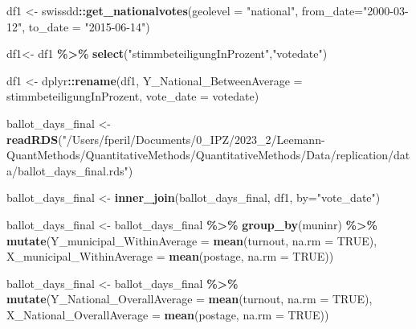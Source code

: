 \documentclass[
]{book}
\newenvironment{Shaded}{\begin{snugshade}}{\end{snugshade}}
\newcommand{\AttributeTok}[1]{\textcolor[rgb]{0.13,0.29,0.53}{#1}}
\newcommand{\ConstantTok}[1]{\textcolor[rgb]{0.56,0.35,0.01}{#1}}
\newcommand{\FunctionTok}[1]{\textcolor[rgb]{0.13,0.29,0.53}{\textbf{#1}}}
\newcommand{\NormalTok}[1]{#1}
\newcommand{\OtherTok}[1]{\textcolor[rgb]{0.56,0.35,0.01}{#1}}
\newcommand{\SpecialCharTok}[1]{\textcolor[rgb]{0.81,0.36,0.00}{\textbf{#1}}}
\newcommand{\StringTok}[1]{\textcolor[rgb]{0.31,0.60,0.02}{#1}}
\begin{document}
\begin{Shaded}
\begin{Highlighting}[]
\NormalTok{df1 }\OtherTok{\textless{}{-}}\NormalTok{ swissdd}\SpecialCharTok{::}\FunctionTok{get\_nationalvotes}\NormalTok{(}\AttributeTok{geolevel =} \StringTok{"national"}\NormalTok{, }\AttributeTok{from\_date=}\StringTok{"2000{-}03{-}12"}\NormalTok{, }\AttributeTok{to\_date =} \StringTok{"2015{-}06{-}14"}\NormalTok{)}

\NormalTok{df1}\OtherTok{\textless{}{-}}\NormalTok{ df1 }\SpecialCharTok{\%\textgreater{}\%}
  \FunctionTok{select}\NormalTok{(}\StringTok{"stimmbeteiligungInProzent"}\NormalTok{,}\StringTok{"votedate"}\NormalTok{)}
  
\NormalTok{df1 }\OtherTok{\textless{}{-}}\NormalTok{ dplyr}\SpecialCharTok{::}\FunctionTok{rename}\NormalTok{(df1, }\AttributeTok{Y\_National\_BetweenAverage =}\NormalTok{ stimmbeteiligungInProzent, }\AttributeTok{vote\_date =}\NormalTok{ votedate)}


\NormalTok{ballot\_days\_final }\OtherTok{\textless{}{-}} \FunctionTok{readRDS}\NormalTok{(}\StringTok{"/Users/fperil/Documents/0\_IPZ/2023\_2/Leemann{-}QuantMethods/QuantitativeMethods/QuantitativeMethods/Data/replication/data/ballot\_days\_final.rds"}\NormalTok{)  }

\NormalTok{ballot\_days\_final }\OtherTok{\textless{}{-}} \FunctionTok{inner\_join}\NormalTok{(ballot\_days\_final, df1, }\AttributeTok{by=}\StringTok{"vote\_date"}\NormalTok{)  }

\NormalTok{ballot\_days\_final }\OtherTok{\textless{}{-}}\NormalTok{ ballot\_days\_final }\SpecialCharTok{\%\textgreater{}\%}
  \FunctionTok{group\_by}\NormalTok{(muninr) }\SpecialCharTok{\%\textgreater{}\%}
  \FunctionTok{mutate}\NormalTok{(}\AttributeTok{Y\_municipal\_WithinAverage =} \FunctionTok{mean}\NormalTok{(turnout, }\AttributeTok{na.rm =} \ConstantTok{TRUE}\NormalTok{), }
         \AttributeTok{X\_municipal\_WithinAverage =} \FunctionTok{mean}\NormalTok{(postage, }\AttributeTok{na.rm =} \ConstantTok{TRUE}\NormalTok{))}


\NormalTok{ballot\_days\_final }\OtherTok{\textless{}{-}}\NormalTok{ ballot\_days\_final }\SpecialCharTok{\%\textgreater{}\%}
  \FunctionTok{mutate}\NormalTok{(}\AttributeTok{Y\_National\_OverallAverage =} \FunctionTok{mean}\NormalTok{(turnout, }\AttributeTok{na.rm =} \ConstantTok{TRUE}\NormalTok{),}
         \AttributeTok{X\_National\_OverallAverage =} \FunctionTok{mean}\NormalTok{(postage, }\AttributeTok{na.rm =} \ConstantTok{TRUE}\NormalTok{))}


\end{Highlighting}
\end{Shaded}
\end{document}
